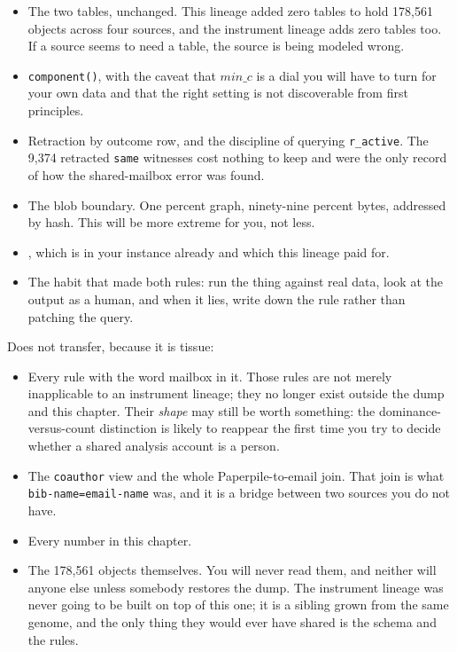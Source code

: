 \begin{itemize}
  \item The two tables, unchanged. This lineage added zero tables to hold 178{,}561 objects across four sources, and the instrument lineage adds zero tables too. If a source seems to need a table, the source is being modeled wrong.
  \item \texttt{component()}, with the caveat that $min\_c$ is a dial you will have to turn for your own data and that the right setting is not discoverable from first principles.
  \item Retraction by outcome row, and the discipline of querying \texttt{r\_active}. The 9{,}374 retracted \texttt{same} witnesses cost nothing to keep and were the only record of how the shared-mailbox error was found.
  \item The blob boundary. One percent graph, ninety-nine percent bytes, addressed by hash. This will be more extreme for you, not less.
  \item {}, which is in your instance already and which this lineage paid for.
  \item The habit that made both rules: run the thing against real data, look at the output as a human, and when it lies, write down the rule rather than patching the query.
\end{itemize}

Does not transfer, because it is tissue:

\begin{itemize}
  \item Every rule with the word mailbox in it. Those rules are not merely inapplicable to an instrument lineage; they no longer exist outside the dump and this chapter. Their \emph{shape} may still be worth something: the dominance-versus-count distinction is likely to reappear the first time you try to decide whether a shared analysis account is a person.
  \item The \texttt{coauthor} view and the whole Paperpile-to-email join. That join is what \texttt{bib-name=\allowbreak email-name} was, and it is a bridge between two sources you do not have.
  \item Every number in this chapter.
  \item The 178{,}561 objects themselves. You will never read them, and neither will anyone else unless somebody restores the dump. The instrument lineage was never going to be built on top of this one; it is a sibling grown from the same genome, and the only thing they would ever have shared is the schema and the rules.
\end{itemize}

